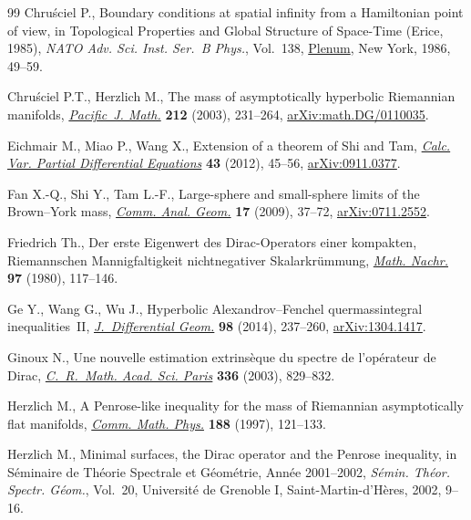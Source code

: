 \documentclass[10pt,a4paper]{amsart}
\numberwithin{equation}{section}
\begin{document}
\begin{thebibliography}{99}
Chru\'sciel P., Boundary conditions at spatial infinity from a {H}amiltonian
 point of view, in Topological Properties and Global Structure of Space-Time
 ({E}rice, 1985), \textit{NATO Adv. Sci. Inst. Ser.~B Phys.}, Vol.~138,
 \href{https://doi.org/10.1007/978-1-4899-3626-4_5}{Plenum}, New York, 1986, 49--59.

Chru\'sciel P.T., Herzlich M., The mass of asymptotically hyperbolic
 {R}iemannian manifolds, \href{https://doi.org/10.2140/pjm.2003.212.231}{\textit{Pacific~J. Math.}} \textbf{212} (2003),
 231--264, \href{https://arxiv.org/abs/math.DG/0110035}{arXiv:math.DG/0110035}.

Eichmair M., Miao P., Wang X., Extension of a theorem of {S}hi and {T}am,
 \href{https://doi.org/10.1007/s00526-011-0402-2}{\textit{Calc. Var. Partial Differential Equations}} \textbf{43} (2012),
 45--56, \href{https://arxiv.org/abs/0911.0377}{arXiv:0911.0377}.

Fan X.-Q., Shi Y., Tam L.-F., Large-sphere and small-sphere limits of the
 {B}rown--{Y}ork mass, \href{https://doi.org/10.4310/CAG.2009.v17.n1.a3}{\textit{Comm. Anal. Geom.}} \textbf{17} (2009), 37--72,
 \href{https://arxiv.org/abs/0711.2552}{arXiv:0711.2552}.

Friedrich Th., Der erste {E}igenwert des {D}irac-{O}perators einer kompakten,
 {R}iemannschen {M}annigfaltigkeit nichtnegativer {S}kalarkr\"ummung,
 \href{https://doi.org/10.1002/mana.19800970111}{\textit{Math. Nachr.}} \textbf{97} (1980), 117--146.

Ge Y., Wang G., Wu J., Hyperbolic {A}lexandrov--{F}enchel quermassintegral
 inequalities~{II}, \href{https://doi.org/10.4310/jdg/1406552250}{\textit{J.~Differential Geom.}} \textbf{98} (2014),
 237--260, \href{https://arxiv.org/abs/1304.1417}{arXiv:1304.1417}.

Ginoux N., Une nouvelle estimation extrins\`eque du spectre de l'op\'erateur de
 {D}irac, \href{https://doi.org/10.1016/S1631-073X(03)00206-1}{\textit{C.~R.~Math. Acad. Sci. Paris}} \textbf{336} (2003), 829--832.

Herzlich M., A {P}enrose-like inequality for the mass of {R}iemannian
 asymptotically flat manifolds, \href{https://doi.org/10.1007/s002200050159}{\textit{Comm. Math. Phys.}} \textbf{188}
 (1997), 121--133.

Herzlich M., Minimal surfaces, the {D}irac operator and the {P}enrose
 inequality, in S\'eminaire de {T}h\'eorie {S}pectrale et {G}\'eom\'etrie, {A}nn\'ee 2001--2002, \textit{S\'emin. Th\'eor. Spectr. G\'eom.}, Vol.~20,
 Universit\'e de Grenoble I, Saint-Martin-d'H\`eres, 2002, 9--16.


\end{thebibliography}
\end{document}
